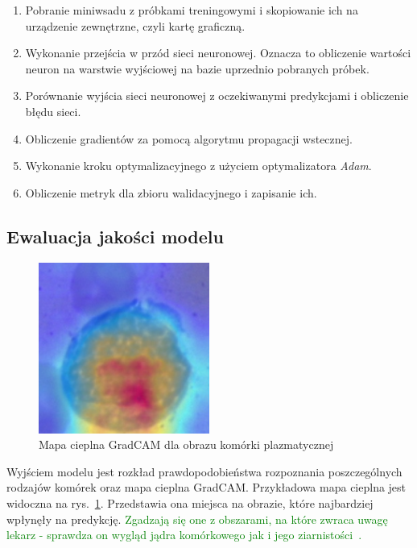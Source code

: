\begin{enumerate}
    \item Pobranie miniwsadu z próbkami treningowymi i skopiowanie ich na urządzenie zewnętrzne, czyli kartę graficzną.
    \item Wykonanie przejścia w przód sieci neuronowej.
    Oznacza to obliczenie wartości neuron na warstwie wyjściowej na bazie uprzednio pobranych próbek.
    \item Porównanie wyjścia sieci neuronowej z oczekiwanymi predykcjami i obliczenie błędu sieci.
    \item Obliczenie gradientów za pomocą algorytmu propagacji wstecznej.
    \item Wykonanie kroku optymalizacyjnego z użyciem optymalizatora \textit{Adam}.
    \item Obliczenie metryk dla zbioru walidacyjnego i zapisanie ich.
\end{enumerate}



\subsection{Ewaluacja jakości modelu}

\begin{figure}
    \centering
    \includegraphics[width=0.5\textwidth]{cam}
    \caption{Mapa cieplna GradCAM dla obrazu komórki plazmatycznej}
    \label{fig:cam}
\end{figure}


Wyjściem modelu jest rozkład prawdopodobieństwa rozpoznania poszczególnych rodzajów komórek oraz mapa cieplna GradCAM.
Przykładowa mapa cieplna jest widoczna na rys.~\ref{fig:cam}.
Przedstawia ona miejsca na obrazie, które najbardziej wpłynęły na predykcję.
\textcolor{green}{
    Zgadzają się one z obszarami, na które zwraca uwagę lekarz - sprawdza on wygląd jądra komórkowego jak i jego ziarnistości~\cite{interna}.
}

